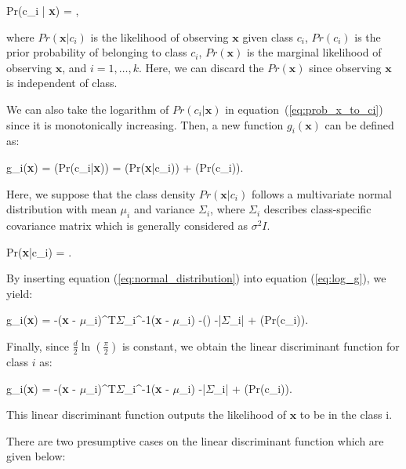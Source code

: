 \be
\label{eq:prob_x_to_ci}
Pr(c_{i} | \textbf{x}) = , 
\ee

where $Pr(\textbf{x}|c_{i})$ is the likelihood of observing $\textbf{x}$ given class $c_{i}$, $Pr(c_{i})$ is the prior probability of belonging to class $c_{i}$, $Pr(\textbf{x})$ is the marginal likelihood of observing $\textbf{x}$, and $i = 1, \dots, k$. Here, we can discard the $Pr(\textbf{x})$ since observing $\textbf{x}$ is independent of class.

We can also take the logarithm of $Pr(c_{i} | \textbf{x})$ in equation~(\ref{eq:prob_x_to_ci}) since it is monotonically increasing. Then, a new function $g_{i}(\textbf{x})$ can be defined as:

\be
\label{eq:log_g}
g_{i}(\textbf{x}) = \ln(Pr(c_{i}|\textbf{x})) = \ln(Pr(\textbf{x}|c_{i})) + \ln(Pr(c_{i}))\:.
\ee

Here, we suppose that the class density $Pr(\textbf{x}|c_{i})$ follows a multivariate normal distribution with mean $\textbf{$\mu$}_{i}$ and variance $\textbf{$\Sigma$}_{i}$, where $\textbf{$\Sigma$}_{i}$ describes class-specific covariance matrix which is generally considered as $\sigma^{2}I$.

\be
\label{eq:normal_distribution}
Pr(\textbf{x}|c_{i}) =  \exp {}.
\ee

By inserting equation (\ref{eq:normal_distribution}) into equation (\ref{eq:log_g}), we yield:

\be
\label{eq:prior_linear_disc_func}
g_{i}(\textbf{x}) = -(\textbf{x} - \textbf{$\mu$}_{i})^{T}{\textbf{$\Sigma$}_{i}}^{-1}(\textbf{x} - \textbf{$\mu$}_{i}) -\ln() -\ln|\textbf{$\Sigma$}_{i}| + \ln(Pr(c_{i}))\:.
\ee

Finally, since $\frac{d}{2}\ln(\frac{\pi}{2})$ is constant, we obtain the linear discriminant function for class $i$ as:

\be
\label{eq:linear_disc_func}
g_{i}(\textbf{x}) = -(\textbf{x} - \textbf{$\mu$}_{i})^{T}{\textbf{$\Sigma$}_{i}}^{-1}(\textbf{x} - \textbf{$\mu$}_{i}) -\ln|\textbf{$\Sigma$}_{i}| + \ln(Pr(c_{i}))\:.
\ee

This linear discriminant function outputs the likelihood of $\textbf{x}$ to be in the class {i}.

There are two presumptive cases on the linear discriminant function which are given below: 

